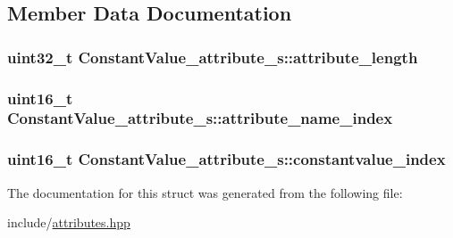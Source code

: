 \subsection{Member Data Documentation}
\hypertarget{structConstantValue__attribute__s_a0de6a32434624a71a93ca95870a2e727}{
\subsubsection[{attribute\+\_\+length}]{\setlength{\rightskip}{0pt plus 5cm}uint32\+\_\+t Constant\+Value\+\_\+attribute\+\_\+s\+::attribute\+\_\+length}}\label{structConstantValue__attribute__s_a0de6a32434624a71a93ca95870a2e727}
\hypertarget{structConstantValue__attribute__s_a8811aed2a17e628c96b323d7e7c22edd}{
\subsubsection[{attribute\+\_\+name\+\_\+index}]{\setlength{\rightskip}{0pt plus 5cm}uint16\+\_\+t Constant\+Value\+\_\+attribute\+\_\+s\+::attribute\+\_\+name\+\_\+index}}\label{structConstantValue__attribute__s_a8811aed2a17e628c96b323d7e7c22edd}
\hypertarget{structConstantValue__attribute__s_a50669a8c13452c0bc3283d182223a131}{
\subsubsection[{constantvalue\+\_\+index}]{\setlength{\rightskip}{0pt plus 5cm}uint16\+\_\+t Constant\+Value\+\_\+attribute\+\_\+s\+::constantvalue\+\_\+index}}\label{structConstantValue__attribute__s_a50669a8c13452c0bc3283d182223a131}


The documentation for this struct was generated from the following file\+:\begin{DoxyCompactItemize}
\item 
include/\hyperlink{attributes_8hpp}{attributes.\+hpp}\end{DoxyCompactItemize}
